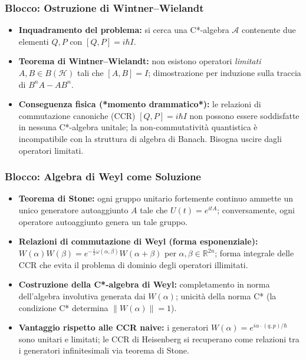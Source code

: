 \documentclass[12pt, a4paper]{article}
\begin{document}
	\subsubsection{Blocco: Ostruzione di Wintner--Wielandt}
	\begin{itemize}
		\item \textbf{Inquadramento del problema:} si cerca una C*-algebra $\mathcal{A}$ contenente due elementi $Q, P$ con $[Q,P] = i\hbar I$.
		\item \textbf{Teorema di Wintner--Wielandt:} non esistono operatori \emph{limitati} $A, B \in B(\mathcal{H})$ tali che $[A,B] = I$; dimostrazione per induzione sulla traccia di $B^nA - AB^n$.
		\item \textbf{Conseguenza fisica (*momento drammatico*):} le relazioni di commutazione canoniche (CCR) $[Q,P]=i\hbar I$ non possono essere soddisfatte in nessuna C*-algebra unitale; la non-commutatività quantistica è incompatibile con la struttura di algebra di Banach. Bisogna uscire dagli operatori limitati.
	\end{itemize}
	
	\subsubsection{Blocco: Algebra di Weyl come Soluzione}
	\begin{itemize}
		\item \textbf{Teorema di Stone:} ogni gruppo unitario fortemente continuo ammette un unico generatore autoaggiunto $A$ tale che $U(t) = e^{itA}$; conversamente, ogni operatore autoaggiunto genera un tale gruppo.
		\item \textbf{Relazioni di commutazione di Weyl (forma esponenziale):} $W(\alpha)W(\beta) = e^{-\frac{i}{2}\omega(\alpha,\beta)}W(\alpha+\beta)$ per $\alpha, \beta \in \mathbb{R}^{2n}$; forma integrale delle CCR che evita il problema di dominio degli operatori illimitati.
		\item \textbf{Costruzione della C*-algebra di Weyl:} completamento in norma dell'algebra involutiva generata dai $W(\alpha)$; unicità della norma C* (la condizione C* determina $\|W(\alpha)\|=1$).
		\item \textbf{Vantaggio rispetto alle CCR naive:} i generatori $W(\alpha) = e^{i\alpha \cdot (q,p)/\hbar}$ sono unitari e limitati; le CCR di Heisenberg si recuperano come relazioni tra i generatori infinitesimali via teorema di Stone.
	\end{itemize}
	
\end{document}
